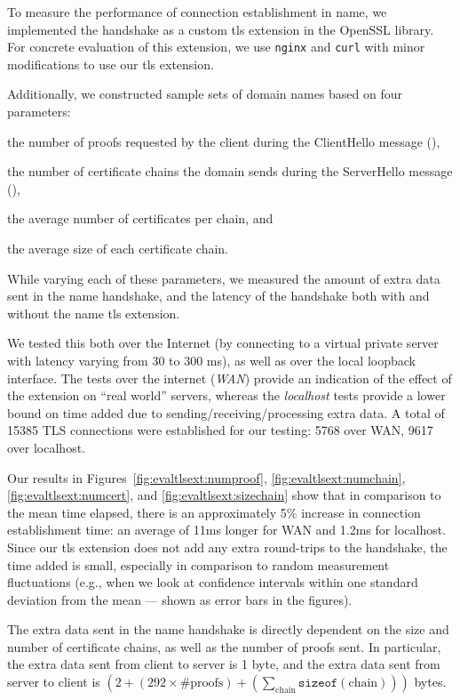 To measure the performance of connection establishment in \ac{name}, we
implemented the handshake as a custom \ac{tls} extension in the OpenSSL library.
For concrete evaluation of this extension, we use \texttt{nginx} and \texttt{curl} with minor
modifications to use our \ac{tls} extension.

Additionally, we constructed sample sets of domain names based on four parameters:
\begin{inparaenum}
\item the number of proofs requested by the client during the
  ClientHello message (\numlas),
\item the number of certificate chains the domain sends during the ServerHello
  message (\policy),
\item the average number of certificates per chain, and
\item the average size of each certificate chain.
\end{inparaenum}
While varying each of these parameters, we measured the amount of extra data
sent in the \ac{name} handshake, and the latency of the handshake both with and
without the \ac{name} \ac{tls} extension.

We tested this both over the Internet (by connecting to a virtual private server
with latency varying from 30 to 300 ms), as well
as over the local loopback interface. The
tests over the internet (\emph{WAN}) provide an indication of the effect of
the extension on ``real world'' servers, 
whereas the \emph{localhost} tests provide a lower bound on time added due to
sending/receiving/processing extra data. A total of 15385 TLS connections were
established for our testing: 5768 over WAN, 9617 over localhost.

Our results in Figures~\ref{fig:evaltlsext:numproof},
\ref{fig:evaltlsext:numchain}, \ref{fig:evaltlsext:numcert}, and
\ref{fig:evaltlsext:sizechain} show that in comparison to the mean time
elapsed, there is an approximately 5\% increase in connection establishment
time: an average of 11ms longer for WAN and 1.2ms for localhost. 
Since our \ac{tls} extension does not add any extra round-trips to the
handshake, the time added is small, especially in comparison to random
measurement fluctuations (e.g., when we look at confidence intervals within one
standard deviation from the mean --- shown as error bars in the figures).

The extra data sent in the \ac{name} handshake is directly dependent on the size
and number of certificate chains, as well as the number of proofs sent. In
particular, the extra data sent from client to server is 1 byte, and the extra
data sent from server to client is
$(2 + (292 \times \text{\#proofs}) +
(\sum_{\text{chain}}\texttt{sizeof}(\text{chain})))$ bytes. 
